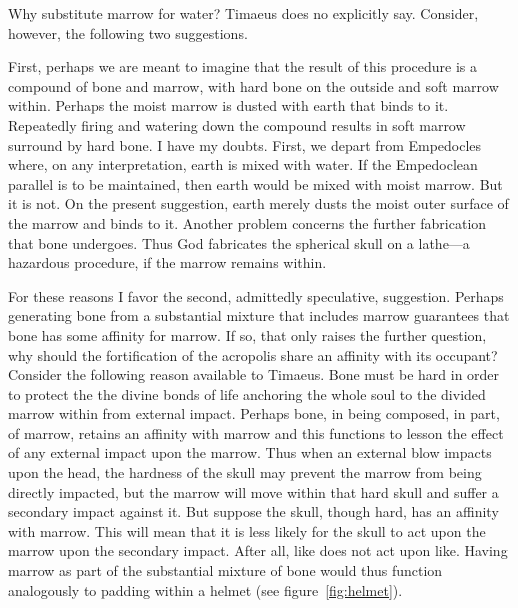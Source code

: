 Why substitute marrow for water? Timaeus does no explicitly say. Consider, however, the following two suggestions.

First, perhaps we are meant to imagine that the result of this procedure is a compound of bone and marrow, with hard bone on the outside and soft marrow within. Perhaps the moist marrow is dusted with earth that binds to it. Repeatedly firing and watering down the compound results in soft marrow surround by hard bone. I have my doubts. First, we depart from Empedocles where, on any interpretation, earth is mixed with water. If the Empedoclean parallel is to be maintained, then earth would be mixed with moist marrow. But it is not. On the present suggestion, earth merely dusts the moist outer surface of the marrow and binds to it. Another problem concerns the further fabrication that bone undergoes. Thus God fabricates the spherical skull on a lathe---a hazardous procedure, if the marrow remains within.

For these reasons I favor the second, admittedly speculative, suggestion. Perhaps generating bone from a substantial mixture that includes marrow guarantees that bone has some affinity for marrow. If so, that only raises the further question, why should the fortification of the acropolis share an affinity with its occupant? Consider the following reason available to Timaeus. Bone must be hard in order to protect the the divine bonds of life anchoring the whole soul to the divided marrow within from external impact. Perhaps bone, in being composed, in part, of marrow, retains an affinity with marrow and this functions to lesson the effect of any external impact upon the marrow. Thus when an external blow impacts upon the head, the hardness of the skull may prevent the marrow from being directly impacted, but the marrow will move within that hard skull and suffer a secondary impact against it. But suppose the skull, though hard, has an affinity with marrow. This will mean that it is less likely for the skull to act upon the marrow upon the secondary impact. After all, like does not act upon like. Having marrow as part of the substantial mixture of bone would thus function analogously to padding within a helmet (see figure~\ref{fig:helmet}).

